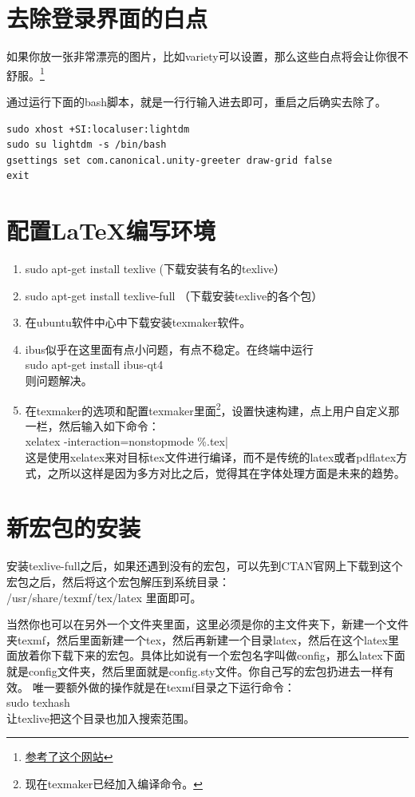 \documentclass[12pt,oneside]{book}
\begin{document}
\begin{common-format}
\section{去除登录界面的白点}
如果你放一张非常漂亮的图片，比如variety可以设置，那么这些白点将会让你很不舒服。\footnote{\href{http://askubuntu.com/questions/72620/how-do-i-remove-the-dots-from-the-lightdm-greeter}{参考了这个网站}}

通过运行下面的bash脚本，就是一行行输入进去即可，重启之后确实去除了。
\begin{Verbatim}
sudo xhost +SI:localuser:lightdm
sudo su lightdm -s /bin/bash
gsettings set com.canonical.unity-greeter draw-grid false
exit
\end{Verbatim}


\section{配置\LaTeX 编写环境}
\begin{enumerate}
\item sudo apt-get install texlive   (下载安装有名的texlive）
\item sudo apt-get install texlive-full   （下载安装texlive的各个包）
\item 在ubuntu软件中心中下载安装texmaker软件。
\item ibus似乎在这里面有点小问题，有点不稳定。在终端中运行\\sudo apt-get install ibus-qt4\\则问题解决。
\item 在texmaker的选项和配置texmaker里面\footnote{现在texmaker已经加入\XeLaTeX 编译命令。}，设置快速构建，点上用户自定义那一栏，然后输入如下命令：\\
xelatex -interaction=nonstopmode \%.tex| \\
这是使用xelatex来对目标tex文件进行编译，而不是传统的latex或者pdflatex方式，之所以这样是因为多方对比之后，觉得其在字体处理方面是未来的趋势。
\end{enumerate}


\section{新宏包的安装}
安装texlive-full之后，如果还遇到没有的宏包，可以先到CTAN官网上下载到这个宏包之后，然后将这个宏包解压到系统目录：\\
/usr/share/texmf/tex/latex 里面即可。

当然你也可以在另外一个文件夹里面，这里必须是你的主文件夹下，新建一个文件夹texmf，然后里面新建一个tex，然后再新建一个目录latex，然后在这个latex里面放着你下载下来的宏包。具体比如说有一个宏包名字叫做config，那么latex下面就是config文件夹，然后里面就是config.sty文件。你自己写的宏包扔进去一样有效。
唯一要额外做的操作就是在texmf目录之下运行命令：\\
sudo texhash  \\
让texlive把这个目录也加入搜索范围。



\end{common-format}
\end{document}
